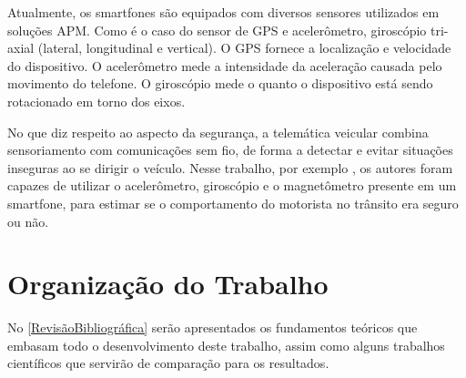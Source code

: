 Atualmente, os smartfones são equipados com diversos sensores utilizados em soluções APM. Como é o caso do sensor de GPS e acelerômetro, giroscópio tri-axial (lateral, longitudinal e vertical). O GPS fornece a localização e velocidade do dispositivo. O acelerômetro mede a intensidade da aceleração causada pelo movimento do telefone. O giroscópio mede o quanto o dispositivo está sendo rotacionado em torno dos eixos.

No que diz respeito ao aspecto da segurança, a telemática veicular combina sensoriamento com comunicações sem fio, de forma a detectar e evitar situações inseguras ao se dirigir o veículo. Nesse trabalho, por exemplo \cite{eren2012estimating}, os autores foram capazes de utilizar o acelerômetro, giroscópio e o magnetômetro presente em um smartfone, para estimar se o comportamento do motorista no trânsito era seguro ou não.

\section{Organização do Trabalho}

No \autoref{RevisãoBibliográfica} serão apresentados os fundamentos teóricos que embasam todo o desenvolvimento deste trabalho, assim como alguns trabalhos científicos que servirão de comparação para os resultados.


